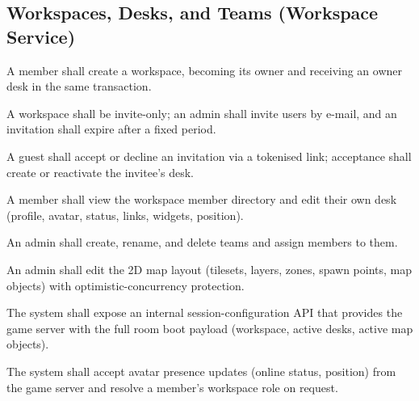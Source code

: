 \subsection{Workspaces, Desks, and Teams (Workspace Service)}
\begin{description}[leftmargin=1.6cm,style=nextline]
  \item[FR-08] A member shall create a workspace, becoming its owner and
  receiving an owner desk in the same transaction.
  \item[FR-09] A workspace shall be invite-only; an admin shall invite users by
  e-mail, and an invitation shall expire after a fixed period.
  \item[FR-10] A guest shall accept or decline an invitation via a tokenised
  link; acceptance shall create or reactivate the invitee's desk.
  \item[FR-11] A member shall view the workspace member directory and edit their
  own desk (profile, avatar, status, links, widgets, position).
  \item[FR-12] An admin shall create, rename, and delete teams and assign members
  to them.
  \item[FR-13] An admin shall edit the 2D map layout (tilesets, layers, zones,
  spawn points, map objects) with optimistic-concurrency protection.
  \item[FR-14] The system shall expose an internal session-configuration API that
  provides the game server with the full room boot payload (workspace, active
  desks, active map objects).
  \item[FR-15] The system shall accept avatar presence updates (online status,
  position) from the game server and resolve a member's workspace role on
  request.
\end{description}

